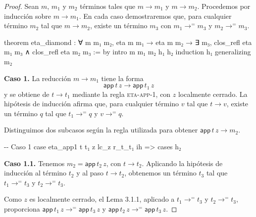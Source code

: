 \documentclass[
  spanish,
  letterpaper,
  DIV=11,
  numbers=noendperiod]{scrreprt}
\newenvironment{Shaded}{\begin{snugshade}}{\end{snugshade}}
\newcommand{\CommentTok}[1]{\textcolor[rgb]{0.37,0.37,0.37}{#1}}
\newcommand{\KeywordTok}[1]{\textcolor[rgb]{0.00,0.23,0.31}{\textbf{#1}}}
\newcommand{\NormalTok}[1]{\textcolor[rgb]{0.00,0.23,0.31}{#1}}
\renewcommand{\NormalTok}[1]{\textcolor[HTML]{000000}{#1}}
\renewcommand{\KeywordTok}[1]{\textcolor[HTML]{0000FF}{#1}}
\renewcommand{\CommentTok}[1]{\textcolor[HTML]{008000}{#1}}
\let\oldgreater\textgreater
\renewcommand{\textgreater}{\null\oldgreater}%
\theoremstyle{remark}
\begin{document}
\begin{proof}
Sean \(m\), \(m_1\) y \(m_2\) términos tales que
\(m \longrightarrow m_1\) y \(m \longrightarrow m_2\). Procedemos por
inducción sobre \(m\longrightarrow m_1\). En cada caso demostraremos
que, para cualquier término \(m_2\) tal que \(m\longrightarrow m_2\),
existe un término \(m_3\) con \(m_1\longrightarrow^{=}m_3\) y
\(m_2\longrightarrow^{=}m_3\).

\begin{Shaded}
\begin{Highlighting}[]
\KeywordTok{theorem}\NormalTok{ eta\_diamond : ∀ m m₁ m₂,}
\NormalTok{    eta m m₁ → eta m m₂ →}
\NormalTok{    ∃ m₃, clos\_refl eta m₁ m₃ ∧ clos\_refl eta m₂ m₃ := }\KeywordTok{by}
\NormalTok{  intro m m₁ m₂ h₁ h₂}
\NormalTok{  induction h₁ generalizing m₂}
\end{Highlighting}
\end{Shaded}

\textbf{Caso 1.} La reducción \(m\longrightarrow m_1\) tiene la forma \[
\mathsf{app}\,t\,z \longrightarrow \mathsf{app}\,t_1\,z
\] y se obtiene de \(t\longrightarrow t_1\) mediante la regla
\textsc{eta-app-1}, con \(z\) localmente cerrado. La hipótesis de
inducción afirma que, para cualquier término \(v\) tal que
\(t\longrightarrow v\), existe un término \(q\) tal que
\(t_1\longrightarrow^{=} q\) y \(v\longrightarrow^{=} q\).

Distinguimos dos subcasos según la regla utilizada para obtener
\(\mathsf{app}\,t\,z\longrightarrow m_2\).

\begin{Shaded}
\begin{Highlighting}[]
  \CommentTok{{-}{-} Caso 1}
\NormalTok{  case eta\_app1 t t₁ z lc\_z r\_t\_t₁ ih =\textgreater{}}
\NormalTok{    cases h₂}
\end{Highlighting}
\end{Shaded}

\textbf{Caso 1.1.} Tenemos \(m_2=\mathsf{app}\,t_2\,z\), con
\(t\longrightarrow t_2\). Aplicando la hipótesis de inducción al término
\(t_2\) y al paso \(t\longrightarrow t_2\), obtenemos un término \(t_3\)
tal que \(t_1\longrightarrow^{=}t_3\) y \(t_2\longrightarrow^{=}t_3\).

Como \(z\) es localmente cerrado, el Lema 3.1.1, aplicado a
\(t_1\longrightarrow^{=}t_3\) y \(t_2\longrightarrow^{=}t_3\),
proporciona
\(\mathsf{app}\,t_1\,z\longrightarrow^{=}\mathsf{app}\,t_3\,z\) y
\(\mathsf{app}\,t_2\,z\longrightarrow^{=}\mathsf{app}\,t_3\,z\).


\end{proof}
\end{document}
